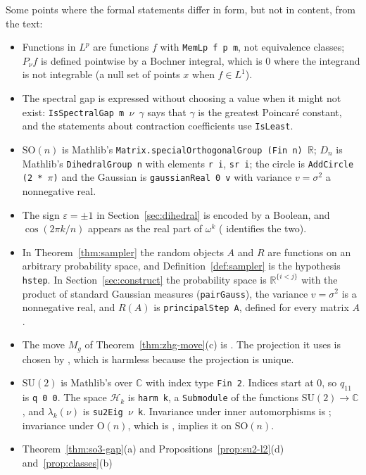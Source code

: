 \documentclass[11pt]{amsart}
\theoremstyle{definition}
\theoremstyle{remark}
\newcommand{\R}{\mathbb{R}}
\newcommand{\C}{\mathbb{C}}
\newcommand{\SO}{\mathrm{SO}}
\newcommand{\Or}{\mathrm{O}}
\begin{document}
Some points where the formal statements differ in form, but not in content, from the text:
\begin{itemize}
\item Functions in $L^p$ are functions $f$ with \texttt{MemLp f p m}, not equivalence classes;
$P_\nu f$ is defined pointwise by a Bochner integral, which is $0$ where the integrand is not
integrable (a null set of points $x$ when $f\in L^1$).
\item The spectral gap is expressed without choosing a value when it might not exist:
\texttt{IsSpectralGap m $\nu$ $\gamma$} says that $\gamma$ is the greatest Poincar\'e constant, and the
statements about contraction coefficients use \texttt{IsLeast}.
\item $\SO(n)$ is Mathlib's \texttt{Matrix.specialOrthogonalGroup (Fin n) $\mathbb{R}$}; $D_n$ is
Mathlib's \texttt{DihedralGroup n} with elements \texttt{r i}, \texttt{sr i}; the circle is
\texttt{AddCircle (2 * $\pi$)} and the Gaussian is \texttt{gaussianReal 0 v} with variance
$v=\sigma^2$ a nonnegative real.
\item The sign $\varepsilon=\pm1$ in Section~\ref{sec:dihedral} is encoded by a Boolean, and
$\cos(2\pi k/n)$ appears as the real part of $\omega^k$ ( identifies the two).
\item In Theorem~\ref{thm:sampler} the random objects $A$ and $R$ are functions on an arbitrary
probability space, and Definition~\ref{def:sampler} is the hypothesis \texttt{hstep}.  In
Section~\ref{sec:construct} the probability space is $\R^{\{i<j\}}$ with the product of standard
Gaussian measures (\texttt{pairGauss}), the variance $v=\sigma^2$ is a nonnegative real, and
$R(A)$ is \texttt{principalStep A}, defined for every matrix $A$.
\item The move $M_g$ of Theorem~\ref{thm:zhg-move}(c) is .  The projection it
uses is chosen by , which is harmless because the projection is unique.
\item $\mathrm{SU}(2)$ is Mathlib's  over $\C$ with index type
\texttt{Fin 2}.  Indices start at $0$, so $q_{11}$ is \texttt{q 0 0}.  The space $\mathcal H_k$
is \texttt{harm k}, a \texttt{Submodule} of the functions $\mathrm{SU}(2)\to\C$, and
$\lambda_k(\nu)$ is \texttt{su2Eig $\nu$ k}.  Invariance under inner automorphisms is
; invariance under $\Or(n)$, which is , implies it on
$\SO(n)$.
\item Theorem~\ref{thm:so3-gap}(a) and Propositions~\ref{prop:su2-l2}(d) and~\ref{prop:classes}(b)

\end{itemize}
\end{document}
